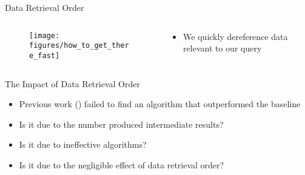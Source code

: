 \begin{frame}{Data Retrieval Order}
    \begin{columns}[T] %
        \begin{column}{.48\textwidth}

       \begin{figure}
            \centering
            \texttt{[image: figures/how\_to\_get\_there\_fast]}
        \end{figure}

        \end{column}%
        \hfill%
        \begin{column}{.48\textwidth}
            \bigskip
            \begin{itemize}
                \item We quickly dereference data relevant to our query
            \end{itemize}
        \end{column}%
    \end{columns}
\end{frame}


\begin{frame}{The Impact of Data Retrieval Order}
    \begin{itemize}
        \item Previous work (\textcite{hartig2016walking}) failed to find an algorithm that outperformed the baseline
        \item Is it due to the number produced intermediate results?
        \item Is it due to ineffective algorithms?
        \item Is it due to the negligible effect of data retrieval order?
    \end{itemize}
\end{frame}
